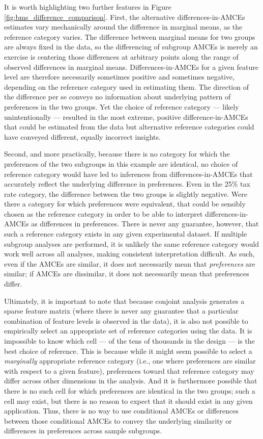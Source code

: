 \documentclass[a4paper,12pt]{article}\usepackage[]{graphicx}\usepackage[]{color}
\begin{document}
It is worth highlighting two further features in Figure \ref{fig:bms_difference_comparison}. First, the alternative differences-in-AMCEs estimates vary mechanically around the difference in marginal means, as the reference category varies. The difference between marginal means for two groups are always fixed in the data, so the differencing of subgroup AMCEs is merely an exercise is centering those differences at arbitrary points along the range of observed differences in marginal means. Differences-in-AMCEs for a given feature level are therefore necessarily sometimes positive and sometimes negative, depending on the reference category used in estimating them. The direction of the difference per se conveys no information about underlying pattern of preferences in the two groups. Yet the choice of reference category --- likely unintentionally --- resulted in the most extreme, positive difference-in-AMCEs that could be estimated from the data but alternative reference categories could have conveyed different, equally incorrect insights.

Second, and more practically, because there is no category for which the preferences of the two subgroups in this example are identical, no choice of reference category would have led to inferences from differences-in-AMCEs that accurately reflect the underlying difference in preferences. Even in the 25\% tax rate category, the difference between the two groups is slightly negative. Were there a category for which preferences were equivalent, that could be sensibly chosen as the reference category in order to be able to interpret differences-in-AMCEs as differences in preferences. There is never any guarantee, however, that such a reference category exists in any given experimental dataset. If multiple subgroup analyses are performed, it is unlikely the same reference category would work well across all analyses, making consistent interpretation difficult. As such, even if the AMCEs are similar, it does not necessarily mean that \textit{preferences} are similar; if AMCEs are dissimilar, it does not necessarily mean that preferences differ.

Ultimately, it is important to note that because conjoint analysis generates a sparse feature matrix (where there is never any guarantee that a particular combination of feature levels is observed in the data), it is also not possible to empirically select an appropriate set of reference categories using the data. It is impossible to know which cell --- of the tens of thousands in the design --- is the best choice of reference. This is because while it might seem possible to select a \textit{marginally} appropriate reference category (i.e., one where preferences are similar with respect to a given feature), preferences toward that reference category may differ across other dimensions in the analysis. And it is furthermore possible that there is no such cell for which preferences are identical in the two groups; such a cell may exist, but there is no reason to expect that it should exist in any given application. Thus, there is no way to use conditional AMCEs or differences between those conditional AMCEs to convey the underlying similarity or differences in preferences across sample subgroups.
\end{document}
